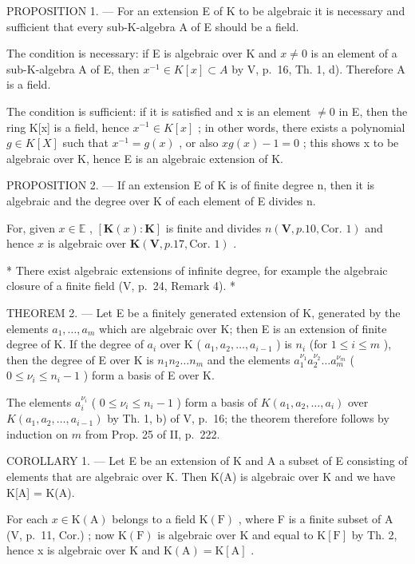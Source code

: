 PROPOSITION 1. --- For an extension E of K to be algebraic it is necessary and sufficient that every sub-K-algebra A of E should be a field.

The condition is necessary: if E is algebraic over K and \(x \neq 0\) is an element of a sub-K-algebra A of E, then \(x^{-1} \in K[x] \subset A\) by V, p.~16, Th. 1, d). Therefore A is a field.

The condition is sufficient: if it is satisfied and x is an element \(\neq 0\) in E, then the ring K{[}x{]} is a field, hence \(x^{-1} \in K[x]\) ; in other words, there exists a polynomial \(g \in K[X]\) such that \(x^{-1} = g(x)\) , or also \(xg(x) - 1 = 0\) ; this shows x to be algebraic over K, hence E is an algebraic extension of K.

PROPOSITION 2. --- If an extension E of K is of finite degree n, then it is algebraic and the degree over K of each element of E divides n.

For, given \(x \in \mathbb{E}\) , \([\mathbf{K}(x): \mathbf{K}]\) is finite and divides \(n(\mathbf{V}, p. 10, \text{Cor. } 1)\) and hence \(x\) is algebraic over \(\mathbf{K}(\mathbf{V}, p. 17, \text{Cor. } 1)\) .

* There exist algebraic extensions of infinite degree, for example the algebraic closure of a finite field (V, p.~24, Remark 4). *

THEOREM 2. --- Let E be a finitely generated extension of K, generated by the elements \(a_1, \ldots, a_m\) which are algebraic over K; then E is an extension of finite degree of K. If the degree of \(a_i\) over K ( \(a_1, a_2, \ldots, a_{i-1}\) ) is \(n_i\) (for \(1 \leq i \leq m\) ), then the degree of E over K is \(n_1 n_2 \ldots n_m\) and the elements \(a_1^{\nu_1} a_2^{\nu_2} \ldots a_m^{\nu_m}\) ( \(0 \leq \nu_i \leq n_i - 1\) ) form a basis of E over K.

The elements \(a_i^{\nu_i}\) ( \(0 \leqslant \nu_i \leqslant n_i - 1\) ) form a basis of \(K(a_1, a_2, \ldots, a_i)\) over \(K(a_1, a_2, \ldots, a_{i-1})\) by Th. 1, b) of V, p.~16; the theorem therefore follows by induction on \(m\) from Prop. 25 of II, p.~222.

COROLLARY 1. --- Let E be an extension of K and A a subset of E consisting of elements that are algebraic over K. Then K(A) is algebraic over K and we have K{[}A{]} = K(A).

For each \(x \in \mathrm{K}(\mathrm{A})\) belongs to a field \(\mathrm{K}(\mathrm{F})\) , where F is a finite subset of A (V, p.~11, Cor.) ; now \(\mathrm{K}(\mathrm{F})\) is algebraic over K and equal to \(\mathrm{K}[\mathrm{F}]\) by Th. 2, hence x is algebraic over K and \(\mathrm{K}(\mathrm{A}) = \mathrm{K}[\mathrm{A}]\) .


